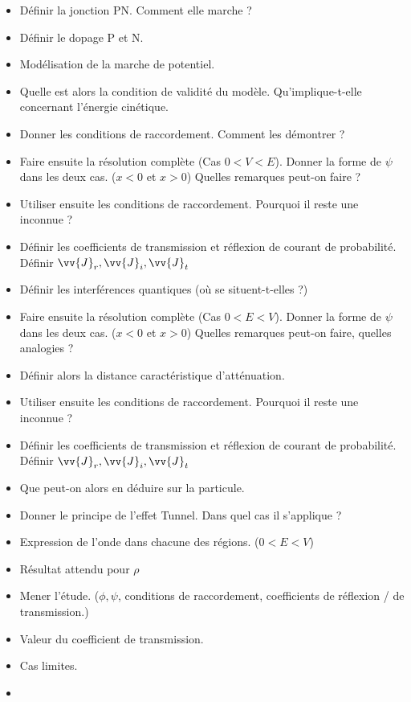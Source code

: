 \documentclass[a4paper, 11pt, hidelinks]{article}
\begin{document}
\begin{itemize}
    \item Définir la jonction PN. Comment elle marche ? \cite{Chapitre22}
    \item Définir le dopage P et N. \cite{Chapitre22}
    \item Modélisation de la marche de potentiel. \cite{Chapitre22}
    \item Quelle est alors la condition de validité du modèle. Qu'implique-t-elle concernant l'énergie cinétique. \cite{Chapitre22}
    \item Donner les conditions de raccordement. Comment les démontrer ? \cite{Chapitre22}
    \item Faire ensuite la résolution complète (Cas $0<V<E$). Donner la forme de $\psi$ dans les deux cas. ($x<0$ et $x>0$) Quelles remarques peut-on faire ? \cite{Chapitre22}
    \item Utiliser ensuite les conditions de raccordement. Pourquoi il reste une inconnue ? \cite{Chapitre22}
    \item Définir les coefficients de transmission et réflexion de courant de probabilité. Définir $\vv{J}_r, \vv{J}_i, \vv{J}_t$ \cite{Chapitre22}
    \item Définir les interférences quantiques (où se situent-t-elles ?) \cite{Chapitre22}
    \item Faire ensuite la résolution complète (Cas $0<E<V$). Donner la forme de $\psi$ dans les deux cas. ($x<0$ et $x>0$) Quelles remarques peut-on faire, quelles analogies ? \cite{Chapitre22}
    \item Définir alors la distance caractéristique d'atténuation. \cite{Chapitre22}
    \item Utiliser ensuite les conditions de raccordement. Pourquoi il reste une inconnue ? \cite{Chapitre22}
    \item Définir les coefficients de transmission et réflexion de courant de probabilité. Définir $\vv{J}_r, \vv{J}_i, \vv{J}_t$ \cite{Chapitre22}
    \item Que peut-on alors en déduire sur la particule. \cite{Chapitre22}
    \item Donner le principe de l'effet Tunnel. Dans quel cas il s'applique ? \cite{Chapitre22}
    \item Expression de l'onde dans chacune des régions. ($0<E<V$) \cite{Chapitre22}
    \item Résultat attendu pour $\rho$ \cite{Chapitre22}
    \item Mener l'étude. ($\phi, \psi$, conditions de raccordement, coefficients de réflexion / de transmission.) \cite{Chapitre22}
    \item Valeur du coefficient de transmission. \cite{Chapitre22}
    \item Cas limites. \cite{Chapitre22}
    \item 
\end{itemize}
\end{document}
